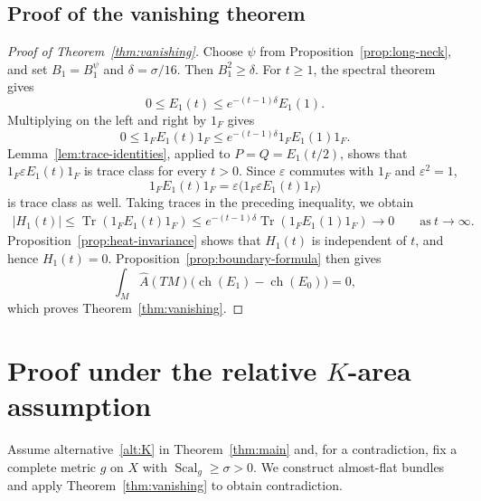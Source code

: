 \documentclass[12pt,reqno]{amsart}
\numberwithin{equation}{section}
\theoremstyle{definition}
\newcommand{\Sc}{\operatorname{Scal}}
\newcommand{\Ahat}{\widehat A}
\newcommand{\ch}{\operatorname{ch}}
\newcommand{\Tr}{\operatorname{Tr}}
\begin{document}
\subsection{Proof of the vanishing theorem}
\begin{proof}[Proof of Theorem~\ref{thm:vanishing}]
Choose $\psi$ from Proposition~\ref{prop:long-neck}, and set
$B_1=B_1^\psi$ and $\delta=\sigma/16$.  Then $B_1^2\geq\delta$.
For $t\geq1$, the spectral theorem gives
\[
 0\leq E_1(t)\leq e^{-(t-1)\delta}E_1(1).
\]
Multiplying on the left and right by $1_F$ gives
\[
 0\leq1_FE_1(t)1_F
 \leq e^{-(t-1)\delta}1_FE_1(1)1_F.
\]
Lemma~\ref{lem:trace-identities}, applied to
$P=Q=E_1(t/2)$, shows that
$1_F\varepsilon E_1(t)1_F$ is trace class for every $t>0$.
Since $\varepsilon$ commutes with $1_F$ and $\varepsilon^2=1$,
\[
 1_FE_1(t)1_F
 =\varepsilon\bigl(1_F\varepsilon E_1(t)1_F\bigr)
\]
is trace class as well.  Taking traces in the preceding inequality,
we obtain
\[
 \begin{aligned}
 |H_1(t)|
 \leq\Tr(1_FE_1(t)1_F)
 \leq e^{-(t-1)\delta}\Tr(1_FE_1(1)1_F)
 \longrightarrow0
 \qquad \text{as}\ t\to\infty.
 \end{aligned}
\]
Proposition~\ref{prop:heat-invariance} shows that $H_1(t)$ is
independent of $t$, and hence $H_1(t)=0$.  Proposition~\ref{prop:boundary-formula}
then gives
\[
 \int_M\Ahat(TM)\bigl(\ch(E_1)-\ch(E_0)\bigr)=0,
\]
which proves Theorem~\ref{thm:vanishing}.
\end{proof}



\vspace{0.5cm}

\section{Proof under the relative $K$-area assumption}\label{sec:K}

Assume alternative~\ref{alt:K} in Theorem~\ref{thm:main} and, for a contradiction, fix a
complete metric $g$ on $X$ with $\Sc_g\geq\sigma>0$.  We construct almost-flat bundles and apply Theorem~\ref{thm:vanishing}
to obtain contradiction.
\end{document}
